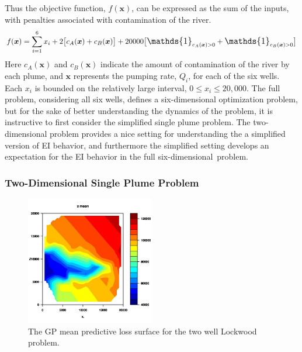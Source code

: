 \documentclass[12pt]{article}
\def \oner {
	\mathlarger{\mathds{1}}
}
\begin{document}
	Thus the objective function, $f(\bm{x})$, can be expressed as the sum of the inputs, with penalties associated with contamination of the river. %
	\begin{equation}
	f(\bm{x}) = \sum_{i=1}^6 x_i +  2\big[ c_A(\bm{x}) + c_B(\bm{x}) \big] + 20000 \big[ \oner_{c_A(\bm{x})>0} + \oner_{c_B(\bm{x})>0} \big] 
	\end{equation}
	Here $c_A(\bm{x})$ and $c_B(\bm{x})$ indicate the amount of contamination of the river by each plume, and $\bm{x}$ represents the pumping rate, $Q_i$, for each of the six wells.
	Each $x_i$ is bounded on the relatively large interval, \mbox{$0\le x_i\le20,000$}. 
	The full problem, considering all six wells, defines a six-dimensional optimization problem, but for the sake of better understanding the dynamics of the problem, it is instructive to first consider the simplified single plume problem. 
	The two-dimensional problem provides a nice setting for understanding the a simplified version of EI behavior, and furthermore the simplified setting develops an expectation for the EI behavior in the full \mbox{six-dimensional problem.}
	
	\subsubsection{Two-Dimensional Single Plume Problem}
	
	\begin{figure}
	\vspace{-1.1cm}
	\hspace{-1cm}
	\includegraphics[width=0.5\textwidth]{./figures/gpMeanLock240000.jpg}
	\vspace{-0.9cm}
	\caption{The GP mean predictive loss surface for the two well Lockwood problem. }
	\label{lockGP}
	\end{figure}
	
\end{document}
